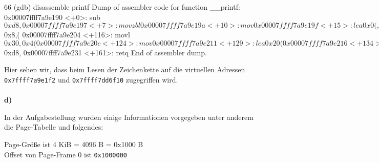 \documentclass{ti2}
\begin{document}
\begin{listing}{66}
(gdb) disassemble printf
Dump of assembler code for function __printf:
   0x00007ffff7a9e190 <+0>:	sub    $0xd8,%
   0x00007ffff7a9e197 <+7>:	movzbl %
   0x00007ffff7a9e19a <+10>:	mov    %
   0x00007ffff7a9e19f <+15>:	lea    0x0(,%
   0x00007ffff7a9e1a7 <+23>:	lea    0x44(%
   0x00007ffff7a9e1ae <+30>:	mov    %
   0x00007ffff7a9e1b3 <+35>:	mov    %
   0x00007ffff7a9e1b8 <+40>:	mov    %
   0x00007ffff7a9e1bb <+43>:	sub    %
   0x00007ffff7a9e1be <+46>:	lea    0xcf(%
   0x00007ffff7a9e1c6 <+54>:	mov    %
   0x00007ffff7a9e1cb <+59>:	mov    %
   0x00007ffff7a9e1d0 <+64>:	jmpq   *%
   0x00007ffff7a9e1d2 <+66>:	movaps %
   0x00007ffff7a9e1d6 <+70>:	movaps %
   0x00007ffff7a9e1da <+74>:	movaps %
   0x00007ffff7a9e1de <+78>:	movaps %
   0x00007ffff7a9e1e2 <+82>:	movaps %
   0x00007ffff7a9e1e6 <+86>:	movaps %
   0x00007ffff7a9e1ea <+90>:	movaps %
   0x00007ffff7a9e1ee <+94>:	movaps %
---Type <return> to continue, or q <return> to quit---
   0x00007ffff7a9e1f2 <+98>:	lea    0xe0(%
   0x00007ffff7a9e1fa <+106>:	mov    %
   0x00007ffff7a9e1fd <+109>:	movl   $0x8,(%
   0x00007ffff7a9e204 <+116>:	movl   $0x30,0x4(%
   0x00007ffff7a9e20c <+124>:	mov    %
   0x00007ffff7a9e211 <+129>:	lea    0x20(%
   0x00007ffff7a9e216 <+134>:	mov    %
   0x00007ffff7a9e21b <+139>:	mov    0x338cee(%
   0x00007ffff7a9e222 <+146>:	mov    (%
   0x00007ffff7a9e225 <+149>:	callq  0x7ffff7a93330 <_IO_vfprintf_internal>
   0x00007ffff7a9e22a <+154>:	add    $0xd8,%
   0x00007ffff7a9e231 <+161>:	retq   
End of assembler dump.
\end{listing}

Hier sehen wir, dass beim Lesen der Zeichenkette auf die virtuellen Adressen \texttt{0x7ffff7a9e1f2} und \texttt{0x7ffff7dd6f10} zugegriffen wird.\\
\\

\textbf{d)}\par

In der Aufgabestellung wurden einige Informationen vorgegeben unter anderem die Page-Tabelle und folgendes:

Page-Größe ist 4 KiB = 4096 B = 0x1000 B\\
Offset von Page-Frame 0 ist \texttt{0x1000000}\\
\end{document}
